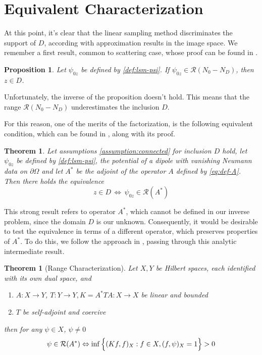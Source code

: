 \documentclass[10pt, a4paper, twoside, openright]{book}
\theoremstyle{definition}
\theoremstyle{plain}
\newtheorem{theorem}[subsection]{Theorem}
\theoremstyle{plain}
\theoremstyle{plain}
\newtheorem{proposition}[subsection]{Proposition}
\theoremstyle{plain}
\theoremstyle{plain}
\theoremstyle{plain}
\theoremstyle{plain}
\theoremstyle{plain}
\begin{document}
\section{Equivalent Characterization}
At this point, it's clear that the linear sampling method discriminates the support of $D$, according with approximation results in the image space. We remember a first result, common to scattering case, whose proof can be found in \cite{somersalo:preprint}.
\begin{proposition}
 Let $\psi_{0z}$ be defined by \ref{def:lsm-psi}. If $\psi_{0z}\in\mathcal{R}({N_0}-{N_D})$, then $z\in D$.
\end{proposition}
Unfortunately, the inverse of the proposition doesn't hold. This means that the range $\mathcal{R}({N_0} - {N_D})$ underestimates the inclusion $D$.
\par
For this reason, one of the merits of the factorization, is the following equivalent condition, which can be found in \cite{kirsch:book}, along with its proof.
\begin{theorem}
\label{theo:equivalence}
 Let assumptions \ref{assumption:connected} for inclusion $D$ hold, let $\psi_{0z}$ be defined by \ref{def:lsm-psi}, the potential of a dipole with vanishing Neumann data on $\partial \Omega$ and let $A^*$ be the adjoint of the operator $A$ defined by \eqref{eq:def-A}.
 Then there holds the equivalence 
 \begin{equation}
  z \in D \,\Longleftrightarrow \,\psi_{0z} \in \mathcal{R}(A^*)
 \end{equation}
\end{theorem}
This strong result refers to operator $A^*$, which cannot be defined in our inverse problem, since the domain $D$ is our unknown. Consequently, it would be desirable to test the equivalence in terms of a different operator, which preserves properties of $A^*$. To do this, we follow the approach in \cite{kirsch:book}, passing through this analytic intermediate result.
\begin{theorem}[Range Characterization]
\label{theo:range-characterization}
 Let $X,Y$ be Hilbert spaces, each identified with its own dual space, and 
 \begin{enumerate}
  \item $A:X\to Y$, $T:Y\to Y, K=A^*TA:X\to X$ be linear and bounded
  \item $T$ be self-adjoint and coercive
 \end{enumerate}
 then for any $\psi \in X$, $\psi\neq 0$
 \begin{equation}
 \psi \in \mathcal{R}(A^*) \Leftrightarrow \inf\Big\{(Kf,f)_X   : f\in X, (f,\psi)_X=1\Big\}>0\\
 \end{equation}
\end{theorem}
\end{document}
